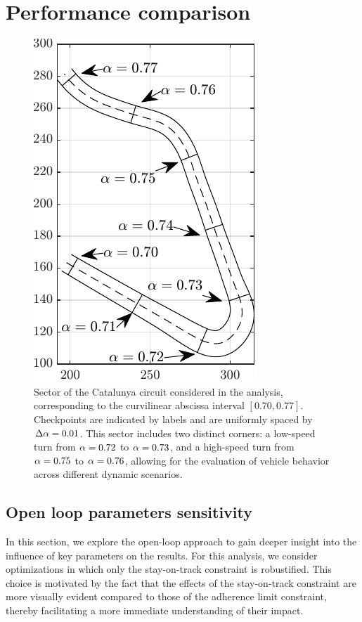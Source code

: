 \section{Performance comparison} 
\label{sec:performance_comparison}

\begin{figure}
	\centering
	\includegraphics{Fig/track.pdf}
	\caption{Sector of the Catalunya circuit considered in the analysis, corresponding to the curvilinear abscissa interval $\left[0.70, 0.77\right]$. Checkpoints are indicated by labels and are uniformly spaced by $\Delta\alpha=0.01$. This sector includes two distinct corners: a low-speed turn from $\alpha = 0.72$ to $\alpha = 0.73$, and a high-speed turn from $\alpha = 0.75$ to $\alpha = 0.76$, allowing for the evaluation of vehicle behavior across different dynamic scenarios.}
	\label{fig:track}
\end{figure}

\subsection{Open loop parameters sensitivity}
\label{sec:ol_param_sensitivity}
In this section, we explore the open-loop approach to gain deeper insight into the influence of key parameters on the results. For this analysis, we consider optimizations in which only the stay-on-track constraint is robustified. This choice is motivated by the fact that the effects of the stay-on-track constraint are more visually evident compared to those of the adherence limit constraint, thereby facilitating a more immediate understanding of their impact. 

